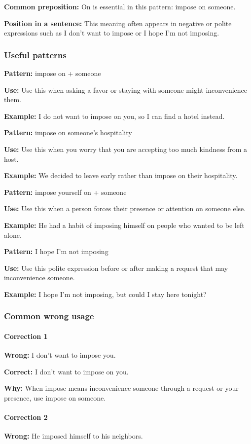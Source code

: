 \documentclass[11pt]{article}
\begin{document}
\textbf{Common preposition:} On is essential in this pattern: impose on someone.

\textbf{Position in a sentence:} This meaning often appears in negative or polite expressions such as I don't want to impose or I hope I'm not imposing.

\subsubsection{Useful patterns}
\textbf{Pattern:} impose on + someone

\textbf{Use:} Use this when asking a favor or staying with someone might inconvenience them.

\textbf{Example:} I do not want to impose on you, so I can find a hotel instead.

\textbf{Pattern:} impose on someone's hospitality

\textbf{Use:} Use this when you worry that you are accepting too much kindness from a host.

\textbf{Example:} We decided to leave early rather than impose on their hospitality.

\textbf{Pattern:} impose yourself on + someone

\textbf{Use:} Use this when a person forces their presence or attention on someone else.

\textbf{Example:} He had a habit of imposing himself on people who wanted to be left alone.

\textbf{Pattern:} I hope I'm not imposing

\textbf{Use:} Use this polite expression before or after making a request that may inconvenience someone.

\textbf{Example:} I hope I'm not imposing, but could I stay here tonight?

\subsubsection{Common wrong usage}
\paragraph{Correction 1}
\textbf{Wrong:} I don't want to impose you.

\textbf{Correct:} I don't want to impose on you.

\textbf{Why:} When impose means inconvenience someone through a request or your presence, use impose on someone.

\paragraph{Correction 2}
\textbf{Wrong:} He imposed himself to his neighbors.
\end{document}
